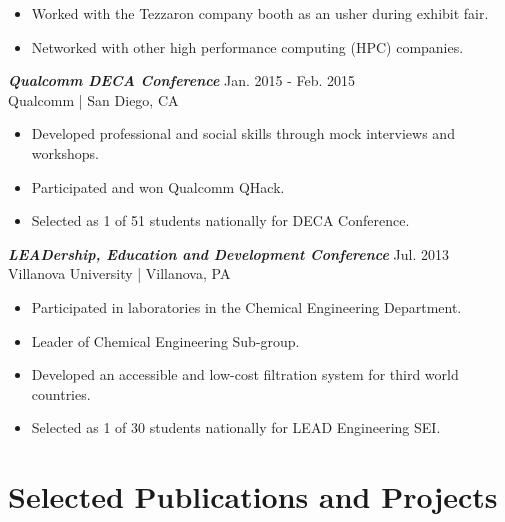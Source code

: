 \documentclass[letter]{res}
\begin{document}
\begin{resume}
 \vspace{-4mm}

 \begin{itemize}
 \item Worked with the Tezzaron company booth as an usher during exhibit fair.
 \item Networked with other high performance computing (HPC) companies.
 \end{itemize}

\vspace{-2mm}

{\sl \textbf{Qualcomm DECA Conference}} \hfill Jan. 2015 - Feb. 2015\\
Qualcomm | San Diego, CA \newline

 \vspace{-4mm}

 \begin{itemize}
 \item Developed professional and social skills through mock interviews and workshops.
 \item Participated and won Qualcomm QHack.
 \item Selected as 1 of 51 students nationally for DECA Conference.
 \end{itemize}

\vspace{-2mm}

{\sl \textbf{LEADership, Education and Development Conference}} \hfill Jul. 2013\\
Villanova University | Villanova, PA \newline

 \vspace{-4mm}

\begin{itemize}
\item Participated in laboratories in the Chemical Engineering Department.
\item Leader of Chemical Engineering Sub-group.
\item Developed an accessible and low-cost filtration system for third world countries.
\item Selected as 1 of 30 students nationally for LEAD Engineering SEI.
\end{itemize}

\vspace{-2mm}

\section{Selected Publications and Projects}


\end{resume}
\end{document}
